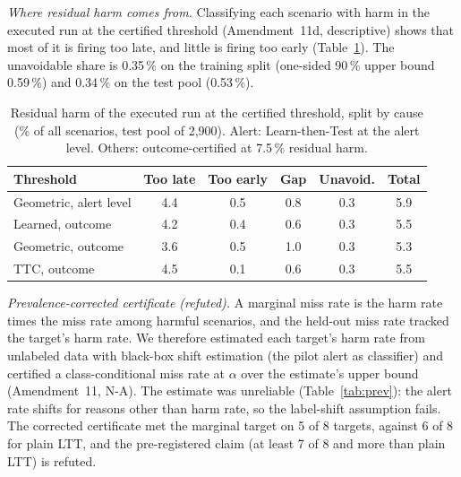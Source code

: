 \documentclass[lettersize,journal]{IEEEtran}
\begin{document}
\emph{Where residual harm comes from.} Classifying each scenario with harm
in the executed run at the certified threshold (Amendment~11d, descriptive)
shows that most of it is firing too late, and little is firing too early
(Table~\ref{tab:decomp}). The unavoidable share is 0.35\,\% on the training
split (one-sided 90\,\% upper bound 0.59\,\%) and 0.34\,\% on the test pool
(0.53\,\%).

\begin{table}[h]
\caption{Residual harm of the executed run at the certified threshold, split
by cause (\% of all scenarios, test pool of 2{,}900). Alert: Learn-then-Test
at the alert level. Others: outcome-certified at 7.5\,\% residual harm.}
\label{tab:decomp}
\centering
\scriptsize\setlength{\tabcolsep}{2.5pt}
\begin{tabular}{lccccc}
\toprule
Threshold & Too late & Too early & Gap & Unavoid. & Total \\
\midrule
Geometric, alert level & 4.4 & 0.5 & 0.8 & 0.3 & 5.9 \\
Learned, outcome & 4.2 & 0.4 & 0.6 & 0.3 & 5.5 \\
Geometric, outcome & 3.6 & 0.5 & 1.0 & 0.3 & 5.3 \\
TTC, outcome & 4.5 & 0.1 & 0.6 & 0.3 & 5.5 \\
\bottomrule
\end{tabular}
\end{table}

\emph{Prevalence-corrected certificate (refuted).} A marginal miss rate is the
harm rate times the miss rate among harmful scenarios, and the held-out
miss rate tracked the target's harm rate. We therefore estimated each
target's harm rate from unlabeled data with black-box shift estimation (the
pilot alert as classifier) and certified a class-conditional miss rate at
$\alpha$ over the estimate's upper bound (Amendment~11, N-A). The estimate
was unreliable (Table~\ref{tab:prev}): the alert rate shifts for reasons
other than harm rate, so the label-shift assumption fails. The corrected
certificate met the marginal target on 5 of 8 targets, against 6 of 8 for
plain LTT, and the pre-registered claim (at least 7 of 8 and more than
plain LTT) is refuted.
\end{document}
